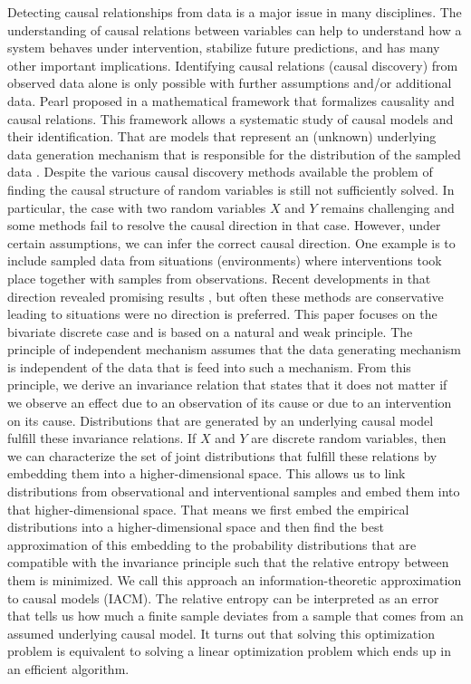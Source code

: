 \documentclass[letterpaper]{article}
\begin{document}
Detecting causal relationships from data is a major issue in many disciplines. The understanding of causal relations between variables can help to understand how a system behaves under intervention, stabilize future predictions, and has many other important implications. Identifying causal relations (causal discovery) from observed data alone is only possible with further assumptions and/or additional data. Pearl proposed in  \cite{Pea09} a mathematical framework that formalizes causality and causal relations. This framework allows a systematic study of causal models and their identification. That are models that represent an (unknown) underlying data generation mechanism that is responsible for the distribution of the sampled data \cite{PJS17}. Despite the various causal discovery methods available the problem of finding the causal structure of random variables is still not sufficiently solved. In particular, the case with two random variables $X$ and $Y$ remains challenging and some methods fail to resolve the causal direction in that case. However, under certain assumptions, we can infer the correct causal direction. One example is to include sampled data from situations (environments) where interventions took place together with samples from observations. Recent developments in that direction revealed promising results \cite{PBM16, HPM18}, but often these methods are conservative leading to situations were no direction is preferred. This paper focuses on the bivariate discrete case and is based on a natural and weak principle. The principle of independent mechanism assumes that the data generating mechanism is independent of the data that is feed into such a mechanism. From this principle, we derive an invariance relation that states that it does not matter if we observe an effect due to an observation of its cause or due to an intervention on its cause. Distributions that are generated by an underlying causal model fulfill these invariance relations. If $X$ and $Y$ are discrete random variables, then we can characterize the set of joint distributions that fulfill these relations by embedding them into a higher-dimensional space. This allows us to link distributions from observational and interventional samples and embed them into that higher-dimensional space. That means we first embed the empirical distributions into a higher-dimensional space and then find the best approximation of this embedding to the probability distributions that are compatible with the invariance principle such that the relative entropy between them is minimized. We call this approach an information-theoretic approximation to causal models (IACM). The relative entropy can be interpreted as an error that tells us how much a finite sample deviates from a sample that comes from an assumed underlying causal model. It turns out that solving this optimization problem is equivalent to solving a linear optimization problem which ends up in an efficient algorithm.
\end{document}
